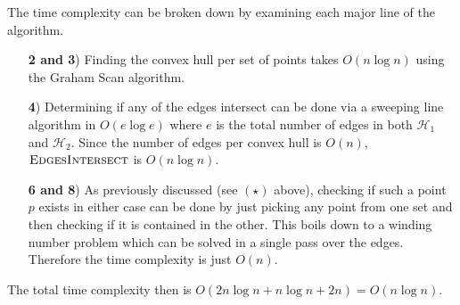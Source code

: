 \documentclass{eeleyes}
\begin{document}
The time complexity can be broken down by examining each major line of the algorithm.

\begin{enumerate}
    \item[\textbf{2 and 3})] 
        Finding the convex hull per set of points takes $O(n \log n)$ using the Graham Scan algorithm.
    \item[\textbf{4})] 
        Determining if any of the edges intersect can be done via a sweeping line algorithm in $O(e \log e)$ where $e$ is the total number of edges in both $\mathcal{H}_1$ and $\mathcal{H}_2$. Since the number of edges per convex hull is $O(n)$, $\textsc{EdgesIntersect}$ is $O(n \log n)$.
    \item[\textbf{6 and 8})]
        As previously discussed (see $(\star)$ above), checking if such a point $p$ exists in either case can be done by just picking any point from one set and then checking if it is contained in the other. This boils down to a winding number problem which can be solved in a single pass over the edges. Therefore the time complexity is just $O(n)$.
\end{enumerate}
The total time complexity then is $O(2 n \log n + n \log n + 2n) = O(n \log n)$.
\end{document}
